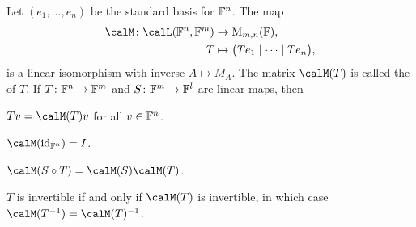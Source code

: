 \begin{proposition}
    \label{prop:smr-properties}
    Let $(e_1, \ldots, e_n)$ be the standard basis for $\mathbb{F}^n$. The map
    \begin{align*}
        \calM \colon \lin(\fieldF^n, \fieldF^m) &\to \mat{m,n}{\fieldF}, \\
        T &\mapsto \bigl( Te_1 \mid \cdots \mid Te_n \bigr),
    \end{align*}
    is a linear isomorphism with inverse $A \mapsto M_A$. The matrix $\smr{T}$ is called the  of $T$. If $T \colon \mathbb{F}^n \to \mathbb{F}^m$ and $S \colon \mathbb{F}^m \to \mathbb{F}^l$ are linear maps, then
    \begin{enumproposition}
        \item \label{enum:smr-vector-multiplication} $Tv = \smr{T}v$ for all $v \in \mathbb{F}^n$.
        
        \item \label{enum:smr-of-identity-map} $\smr{\id_{\fieldF^n}} = I$.

        \item \label{enum:smr-multiplicative} $\smr{S \circ T} = \smr{S} \smr{T}$.

        \item \label{enum:smr-invertibility} $T$ is invertible if and only if $\smr{T}$ is invertible, in which case $\smr{\inv{T}} = \inv{\smr{T}}$.
    \end{enumproposition}
\end{proposition}

